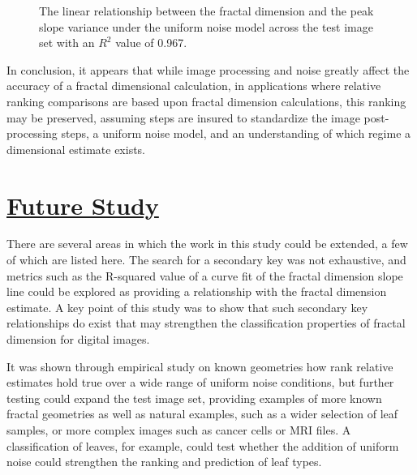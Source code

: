 \documentclass[12pt, oneside]{book}
\begin{document}
\begin{figure}[!b]
  \centering
  \caption[The linear relationship between the fractal dimension and the peak slope variance under the uniform noise model]{The linear relationship between the fractal dimension and the peak slope variance under the uniform noise model across the test image set with an \(R^{2}\) value of 0.967.}
  \label{fig:finalresult}
\end{figure}

In conclusion, it appears that while image processing and noise greatly affect the accuracy of a fractal dimensional calculation, in applications where relative ranking comparisons are based upon fractal dimension calculations, this ranking may be preserved, assuming steps are insured to standardize the image post-processing steps, a uniform noise model, and an understanding of which regime a dimensional estimate exists.


\section{\underline{Future Study}}
There are several areas in which the work in this study could be extended, a few of which are listed here.  The search for a secondary key was not exhaustive, and metrics such as the R-squared value of a curve fit of the fractal dimension slope line could be explored as providing a relationship with the fractal dimension estimate.  A key point of this study was to show that such secondary key relationships do exist that may strengthen the classification properties of fractal dimension for digital images.

It was shown through empirical study on known geometries how rank relative estimates hold true over a wide range of uniform noise conditions, but further testing could expand the test image set, providing examples of more known fractal geometries as well as natural examples, such as a wider selection of leaf samples, or more complex images such as cancer cells or MRI files.  A classification of leaves, for example, could test whether the addition of uniform noise could strengthen the ranking and prediction of leaf types.
\end{document}
